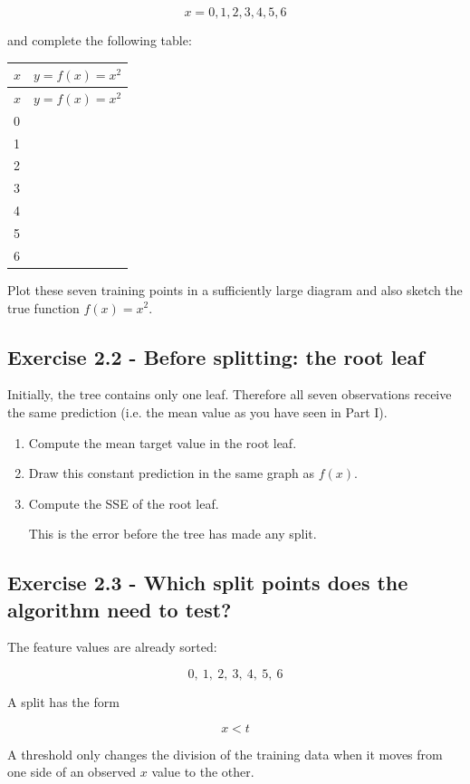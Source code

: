 \documentclass{course_sheet}
\begin{document}
\[
x=0,1,2,3,4,5,6
\]

and complete the following table:

\begingroup
\small
\setlength{\tabcolsep}{4pt}
\begin{longtable}{l|l}
$x$ & $y=f(x)=x^2$ \\
\hline
\endfirsthead
$x$ & $y=f(x)=x^2$ \\
\hline
\endhead
0 &  \\[3pt]
1 &  \\[3pt]
2 &  \\[3pt]
3 &  \\[3pt]
4 &  \\[3pt]
5 &  \\[3pt]
6 &  \\[3pt]
\end{longtable}
\endgroup
Plot these seven training points in a sufficiently large diagram and also sketch the true function $f(x)=x^2$.

\subsection*{Exercise 2.2 - Before splitting: the root leaf}
Initially, the tree contains only one leaf. Therefore all seven observations receive the same prediction (i.e. the mean value as you have seen in Part I).

\begin{enumerate}
\item
Compute the mean target value in the root leaf.

\item
Draw this constant prediction in the same graph as $f(x)$.

\item
Compute the SSE of the root leaf.

This is the error before the tree has made any split.

\end{enumerate}
\subsection*{Exercise 2.3 - Which split points does the algorithm need to test?}
The feature values are already sorted:

\[
0,\ 1,\ 2,\ 3,\ 4,\ 5,\ 6
\]

A split has the form

\[
x<t
\]

A threshold only changes the division of the training data when it moves from one side of an observed $x$ value to the other.
\end{document}
